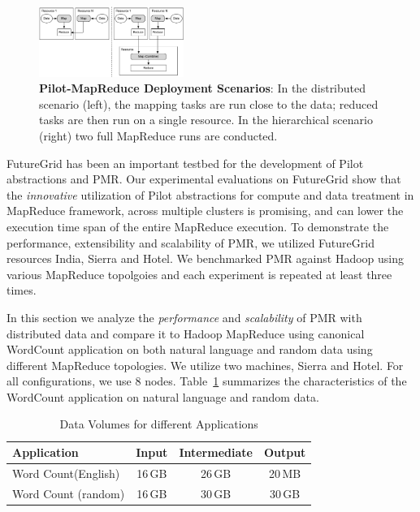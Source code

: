 \documentclass[]{paper}
\begin{document}
\begin{figure}
	\centering
	\includegraphics[width=0.42\textwidth]{figures/distributed_hierachical.pdf}
	\caption{\textbf{Pilot-MapReduce Deployment Scenarios}: In the
          distributed scenario (left), the mapping tasks are run close
          to the data; reduced tasks are then run on a single
          resource. In the hierarchical scenario (right) two full
          MapReduce runs are
          conducted. \label{fig:mrtopologies}}
\end{figure}

FutureGrid has been an important testbed for the development of Pilot abstractions and PMR.
Our experimental evaluations on FutureGrid show that the \textit{innovative} utilization of Pilot abstractions for compute and data treatment in MapReduce framework, across multiple clusters is promising, and can lower the execution time span of the entire MapReduce execution. To demonstrate the performance, extensibility and scalability of PMR, we utilized FutureGrid resources India, Sierra and Hotel.  We benchmarked PMR against Hadoop using various MapReduce topolgoies and each experiment is repeated at least three times.

In this section we analyze the \textit{performance} and \textit{scalability} of PMR with distributed data and compare it to Hadoop MapReduce using canonical WordCount application on both natural language and random data using different MapReduce topologies.  We utilize two machines, Sierra and Hotel. For all configurations, we use 8 nodes. Table~\ref{tab:data-volumes} summarizes the characteristics of the WordCount application on natural language and random data.

\begin{table}[ht]
	\centering
\begin{tabular}{|p{2cm}|c|c|c|}
\hline
\textbf{Application} &\textbf{Input} &\textbf{Intermediate} &\textbf{Output}\\
\hline
Word Count\linebreak[4] (English) &16\,GB&26\,GB&20\,MB\\
\hline
Word Count (random) &16\,GB&30\,GB&30\,GB\\
\hline
\end{tabular}
\caption{Data Volumes for different Applications}
\label{tab:data-volumes}
\end{table}
\end{document}
